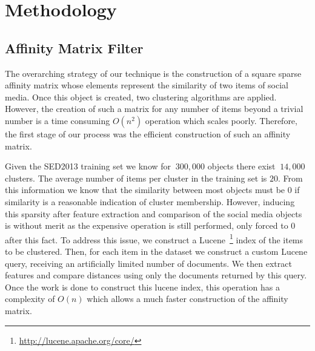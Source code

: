 \documentclass{../acm_proc_article-me11_tweaked}
\begin{document}

\section{Methodology} %
\label{sec:methodology}

\subsection{Affinity Matrix Filter} %
\label{sub:lucene_filter}
The overarching strategy of our technique is the construction of a square sparse affinity matrix whose elements represent the similarity of two items of social media. Once this object is created, two clustering algorithms are applied. However, the creation of such a matrix for any number of items beyond a trivial number is a time consuming $O(n^2)$ operation which scales poorly. Therefore, the first stage of our process was the efficient construction of such an affinity matrix. 

Given the SED2013 training set we know for $~300,000$ objects there exist $~14,000$ clusters. The average number of items per cluster in the training set is $20$. From this information we know that the similarity between most objects must be 0 if similarity is a reasonable indication of cluster membership. However, inducing this sparsity after feature extraction and comparison of the social media objects is without merit as the expensive operation is still performed, only forced to 0 after this fact. To address this issue, we construct a Lucene~\footnote{\url{http://lucene.apache.org/core/}} index of the items to be clustered. Then, for each item in the dataset we construct a custom Lucene query, receiving an artificially limited number of documents. We then extract features and compare distances using only the documents returned by this query. Once the work is done to construct this lucene index, this operation has a complexity of $O(n)$ which allows a much faster construction of the affinity matrix.
\end{document}
